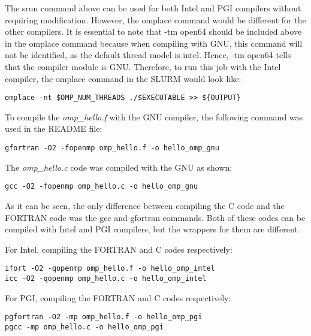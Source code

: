 The srun command above can be used for both Intel and PGI compilers without requiring modification. However, the omplace command would be different for
the other compilers. It is essential to note that -tm open64 should be included above in the omplace command because when compiling with GNU, this 
command will not be identified, as the default thread model is intel. Hence, -tm open64 tells that the compiler module is GNU. Therefore, to run this job
with the Intel compiler, the omplace command in the SLURM would look like:

\begin{tcolorbox}
\begin{Verbatim}[fontsize=\scriptsize]
omplace -nt $OMP_NUM_THREADS ./$EXECUTABLE >> ${OUTPUT}
\end{Verbatim}
\end{tcolorbox}

To compile the \emph{omp\_hello.f} with the GNU compiler, the following command was used in the README file:

\begin{tcolorbox}
\begin{Verbatim}[fontsize=\scriptsize]
gfortran -O2 -fopenmp omp_hello.f -o hello_omp_gnu
\end{Verbatim}
\end{tcolorbox}

The \emph{omp\_hello.c} code was compiled with the GNU as shown:

\begin{tcolorbox}
\begin{Verbatim}[fontsize=\scriptsize]
gcc -O2 -fopenmp omp_hello.c -o hello_omp_gnu
\end{Verbatim}
\end{tcolorbox}

As it can be seen, the only difference between compiling the C code and the FORTRAN code was the gcc and gfortran commands. Both of these codes can be 
compiled with Intel and PGI compilers, but the wrappers for them are different.

For Intel, compiling the FORTRAN and C codes respectively:

\begin{tcolorbox}
\begin{Verbatim}[fontsize=\scriptsize]
ifort -O2 -qopenmp omp_hello.f -o hello_omp_intel
icc -O2 -qopenmp omp_hello.c -o hello_omp_intel
\end{Verbatim}
\end{tcolorbox}

For PGI, compiling the FORTRAN and C codes respectively:

\begin{tcolorbox}
\begin{Verbatim}[fontsize=\scriptsize]
pgfortran -O2 -mp omp_hello.f -o hello_omp_pgi
pgcc -mp omp_hello.c -o hello_omp_pgi
\end{Verbatim}
\end{tcolorbox}
